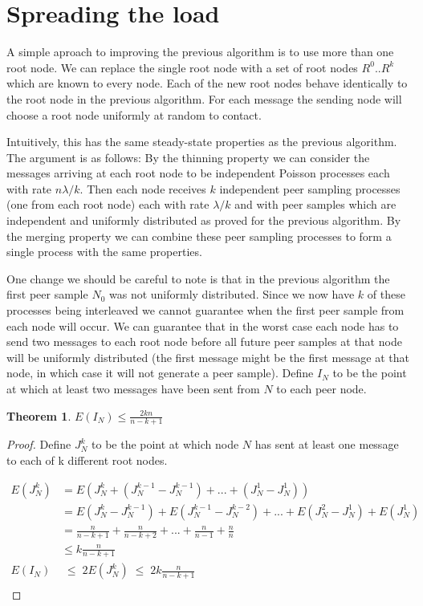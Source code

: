\documentclass[a4paper,10pt]{article}
\newtheorem*{thm}{Theorem}
\begin{document}
\section{Spreading the load}

A simple aproach to improving the previous algorithm is to use more than one root node. We can replace the single root node with a set of root nodes $R^0 .. R^k$ which are known to every node. Each of the new root nodes behave identically to the root node in the previous algorithm. For each message the sending node will choose a root node uniformly at random to contact. 

Intuitively, this has the same steady-state properties as the previous algorithm. The argument is as follows: By the thinning property we can consider the messages arriving at each root node to be independent Poisson processes each with rate $n \lambda / k$. Then each node receives $k$ independent peer sampling processes (one from each root node) each with rate $\lambda / k$ and with peer samples which are independent and uniformly distributed as proved for the previous algorithm. By the merging property we can combine these peer sampling processes to form a single process with the same properties. 

One change we should be careful to note is that in the previous algorithm the first peer sample $N_0$ was not uniformly distributed. Since we now have $k$ of these processes being interleaved we cannot guarantee when the first peer sample from each node will occur. We can guarantee that in the worst case each node has to send two messages to each root node before all future peer samples at that node will be uniformly distributed (the first message might be the first message at that node, in which case it will not generate a peer sample).
Define $I_N$ to be the point at which at least two messages have been sent from $N$ to each peer node.

\begin{thm}$E(I_N) \leq \frac{2kn}{n-k+1}$\end{thm}  

\begin{proof}
Define $J^k_N$ to be the point at which node $N$ has sent at least one message to each of k different root nodes.

\begin{align*}
E(J^k_N) &= E(J^k_N + (J^{k-1}_N - J^{k-1}_N) + ... + (J^1_N - J^1_N)) \\
  &= E(J^k_N - J^{k-1}_N) + E(J^{k-1}_N - J^{k-2}_N) + ... + E(J^2_N - J^1_N) + E(J^1_N) \\
  &= \frac{n}{n-k+1} + \frac{n}{n-k+2} + ... + \frac{n}{n-1} + \frac{n}{n} \\
  &\leq k\frac{n}{n-k+1} \\
E(I_N) & \;\leq\; 2 E(J^k_N) \;\leq\; 2k\frac{n}{n-k+1} \\
\end{align*}
\end{proof}
\end{document}
